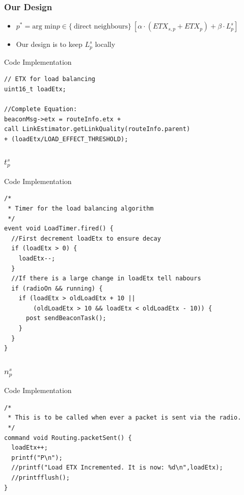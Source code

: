 \documentclass{beamer}
\begin{document}
\begin{frame}[fragile]
  \frametitle{Our Design}
  \begin{itemize}
    \item $p^* = \text{arg min}  p \in \{\ \text{direct neighbours} \}\
                 [\alpha  \cdot (ETX_{s,p} + ETX_p) + \beta \cdot L_p^s]$

    \item Our design is to keep $L_p^s$ locally
  \end{itemize} 
   
  \footnotesize{
  \begin{block}{Code Implementation}
    \begin{verbatim}
// ETX for load balancing                                                                                                                                                              
uint16_t loadEtx;

//Complete Equation:
beaconMsg->etx = routeInfo.etx + 
call LinkEstimator.getLinkQuality(routeInfo.parent) 
+ (loadEtx/LOAD_EFFECT_THRESHOLD);
    \end{verbatim}
  \end{block}
}
\end{frame}

\begin{frame}[fragile]
  \frametitle{$t_p^s$}
  \footnotesize{
    \begin{block}{Code Implementation}
      \begin{verbatim}
/* 
 * Timer for the load balancing algorithm
 */
event void LoadTimer.fired() {
  //First decrement loadEtx to ensure decay
  if (loadEtx > 0) {
    loadEtx--;
  }
  //If there is a large change in loadEtx tell nabours
  if (radioOn && running) {
    if (loadEtx > oldLoadEtx + 10 || 
        (oldLoadEtx > 10 && loadEtx < oldLoadEtx - 10)) {
      post sendBeaconTask();
    }
  }
}
      \end{verbatim}
    \end{block}
  }
\end{frame}

\begin{frame}[fragile]
  \frametitle{$n_p^s$}
  \footnotesize{
    \begin{block}{Code Implementation}
      \begin{verbatim}
/*
 * This is to be called when ever a packet is sent via the radio.
 */
command void Routing.packetSent() {
  loadEtx++;
  printf("P\n");
  //printf("Load ETX Incremented. It is now: %d\n",loadEtx);
  //printfflush();
}
      \end{verbatim}
    \end{block}
  }
\end{frame}
\end{document}
